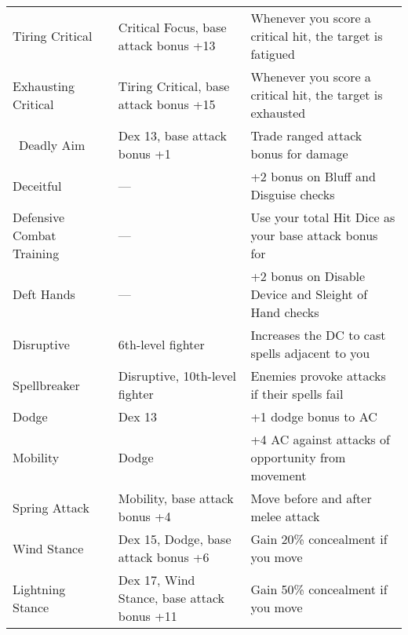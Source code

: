 \begin{table*}[]
\begin{tabularx}{\linewidth}{lXl}
\enspace Tiring Critical & Critical Focus, base attack bonus +13 & Whenever you score a critical hit, the target is fatigued\\
\enspace \enspace Exhausting Critical & Tiring Critical, base attack bonus +15 & Whenever you score a critical hit, the target is exhausted\\\
Deadly Aim & Dex 13, base attack bonus +1 & Trade ranged attack bonus for damage\\
Deceitful & --- & +2 bonus on Bluff and Disguise checks\\
Defensive Combat Training & --- & Use your total Hit Dice as your base attack bonus for \\
Deft Hands & --- & +2 bonus on Disable Device and Sleight of Hand checks\\
Disruptive & 6th-level fighter & Increases the DC to cast spells adjacent to you\\
\enspace Spellbreaker & Disruptive, 10th-level fighter & Enemies provoke attacks if their spells fail\\
Dodge & Dex 13 & +1 dodge bonus to AC\\
\enspace Mobility & Dodge & +4 AC against attacks of opportunity from movement\\
\enspace \enspace Spring Attack & Mobility, base attack bonus +4 & Move before and after melee attack\\
\enspace Wind Stance & Dex 15, Dodge, base attack bonus +6 & Gain 20\% concealment if you move\\
\enspace \enspace Lightning Stance & Dex 17, Wind Stance, base attack bonus +11 & Gain 50\% concealment if you move\\
\end{tabularx}
\end{table*}
